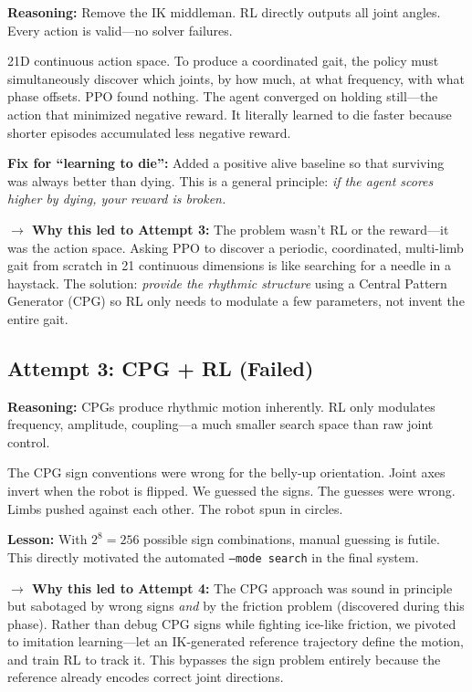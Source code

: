 \documentclass[11pt, a4paper]{article}
\begin{document}
\textbf{Reasoning:} Remove the IK middleman. RL directly outputs all joint angles. Every action is valid---no solver failures.

\begin{failbox}
21D continuous action space. To produce a coordinated gait, the policy must simultaneously discover which joints, by how much, at what frequency, with what phase offsets. PPO found nothing. The agent converged on holding still---the action that minimized negative reward. It literally learned to die faster because shorter episodes accumulated less negative reward.
\end{failbox}

\textbf{Fix for ``learning to die'':} Added a positive alive baseline so that surviving was always better than dying. This is a general principle: \textit{if the agent scores higher by dying, your reward is broken.}

\noindent\textcolor{accentpurple}{\textbf{$\rightarrow$ Why this led to Attempt 3:}} The problem wasn't RL or the reward---it was the action space. Asking PPO to discover a periodic, coordinated, multi-limb gait from scratch in 21 continuous dimensions is like searching for a needle in a haystack. The solution: \textit{provide the rhythmic structure} using a Central Pattern Generator (CPG) so RL only needs to modulate a few parameters, not invent the entire gait.

\subsection{Attempt 3: CPG + RL (Failed)}

\textbf{Reasoning:} CPGs produce rhythmic motion inherently. RL only modulates frequency, amplitude, coupling---a much smaller search space than raw joint control.

\begin{failbox}
The CPG sign conventions were wrong for the belly-up orientation. Joint axes invert when the robot is flipped. We guessed the signs. The guesses were wrong. Limbs pushed against each other. The robot spun in circles.
\end{failbox}

\textbf{Lesson:} With $2^8 = 256$ possible sign combinations, manual guessing is futile. This directly motivated the automated \texttt{--mode search} in the final system.

\noindent\textcolor{accentpurple}{\textbf{$\rightarrow$ Why this led to Attempt 4:}} The CPG approach was sound in principle but sabotaged by wrong signs \textit{and} by the friction problem (discovered during this phase). Rather than debug CPG signs while fighting ice-like friction, we pivoted to imitation learning---let an IK-generated reference trajectory define the motion, and train RL to track it. This bypasses the sign problem entirely because the reference already encodes correct joint directions.
\end{document}
